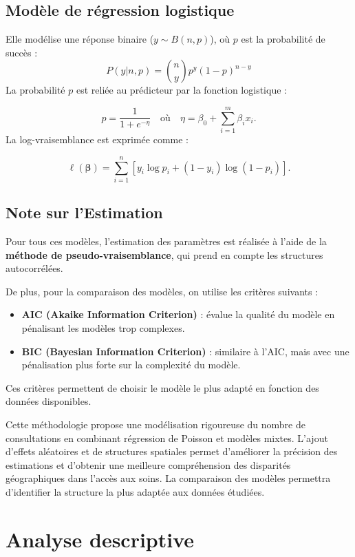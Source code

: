 \documentclass[
]{article}
\providecommand{\tightlist}{%
  \setlength{\itemsep}{0pt}\setlength{\parskip}{0pt}}
\begin{document}
\subsection{Modèle de régression
logistique}\label{moduxe8le-de-ruxe9gression-logistique}

Elle modélise une réponse binaire (\(y \sim B(n, p)\)), où \(p\) est la
probabilité de succès : \[
P(y | n, p) = \binom{n}{y} p^y (1-p)^{n-y}
\] La probabilité \(p\) est reliée au prédicteur par la fonction
logistique :

\[
p = \frac{1}{1 + e^{-\eta}} \quad \text{où} \quad \eta = \beta_0 + \sum_{i=1}^m \beta_i x_i.
\] La log-vraisemblance est exprimée comme :

\[
\ell(\boldsymbol{\beta}) = \sum_{i=1}^n \left[ y_i \log{p_i} + (1-y_i) \log{(1-p_i)} \right].
\]

\subsection{Note sur l'Estimation}\label{note-sur-lestimation}

Pour tous ces modèles, l'estimation des paramètres est réalisée à l'aide
de la \textbf{méthode de pseudo-vraisemblance}, qui prend en compte les
structures autocorrélées.

De plus, pour la comparaison des modèles, on utilise les critères
suivants :

\begin{itemize}
\tightlist
\item
  \textbf{AIC (Akaike Information Criterion)} : évalue la qualité du
  modèle en pénalisant les modèles trop complexes.
\item
  \textbf{BIC (Bayesian Information Criterion)} : similaire à l'AIC,
  mais avec une pénalisation plus forte sur la complexité du modèle.
\end{itemize}

Ces critères permettent de choisir le modèle le plus adapté en fonction
des données disponibles.

Cette méthodologie propose une modélisation rigoureuse du nombre de
consultations en combinant régression de Poisson et modèles mixtes.
L'ajout d'effets aléatoires et de structures spatiales permet
d'améliorer la précision des estimations et d'obtenir une meilleure
compréhension des disparités géographiques dans l'accès aux soins. La
comparaison des modèles permettra d'identifier la structure la plus
adaptée aux données étudiées.

\section{Analyse descriptive}\label{analyse-descriptive}
\end{document}
